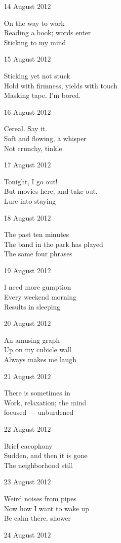 \documentclass[12pt]{article}
\begin{document}
14 August 2012

On the way to work \\
Reading a book; words enter \\
Sticking to my mind

15 August 2012

Sticking yet not stuck \\
Hold with firmness, yields with touch \\
Masking tape. I'm bored.

16 August 2012

Cereal. Say it. \\
Soft and flowing, a whisper \\
Not crunchy, tinkle

17 August 2012

Tonight, I go out! \\
But movies here, and take out. \\
Lure into staying

\newpage

18 August 2012

The past ten minutes \\
The band in the park has played \\
The same four phrases

19 August 2012

I need more gumption \\
Every weekend morning \\
Results in sleeping

20 August 2012

An amusing graph \\
Up on my cubicle wall \\
Always makes me laugh

21 August 2012

There is sometimes in \\
Work, relaxation; the mind \\
focused --- unburdened

22 August 2012

Brief cacophony \\
Sudden, and then it is gone \\
The neighborhood still

23 August 2012

Weird noises from pipes \\
Now how I want to wake up \\
Be calm there, shower

24 August 2012
\end{document}
